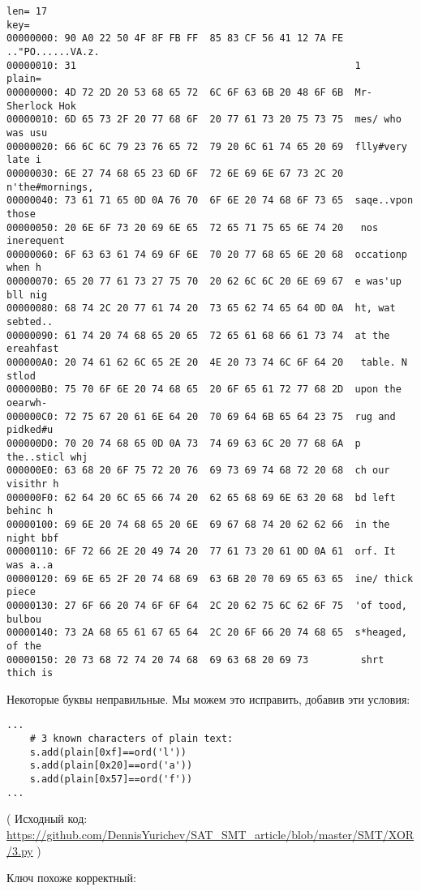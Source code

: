 \begin{lstlisting}
len= 17
key=
00000000: 90 A0 22 50 4F 8F FB FF  85 83 CF 56 41 12 7A FE  .."PO......VA.z.
00000010: 31                                                1
plain=
00000000: 4D 72 2D 20 53 68 65 72  6C 6F 63 6B 20 48 6F 6B  Mr- Sherlock Hok
00000010: 6D 65 73 2F 20 77 68 6F  20 77 61 73 20 75 73 75  mes/ who was usu
00000020: 66 6C 6C 79 23 76 65 72  79 20 6C 61 74 65 20 69  flly#very late i
00000030: 6E 27 74 68 65 23 6D 6F  72 6E 69 6E 67 73 2C 20  n'the#mornings,
00000040: 73 61 71 65 0D 0A 76 70  6F 6E 20 74 68 6F 73 65  saqe..vpon those
00000050: 20 6E 6F 73 20 69 6E 65  72 65 71 75 65 6E 74 20   nos inerequent
00000060: 6F 63 63 61 74 69 6F 6E  70 20 77 68 65 6E 20 68  occationp when h
00000070: 65 20 77 61 73 27 75 70  20 62 6C 6C 20 6E 69 67  e was'up bll nig
00000080: 68 74 2C 20 77 61 74 20  73 65 62 74 65 64 0D 0A  ht, wat sebted..
00000090: 61 74 20 74 68 65 20 65  72 65 61 68 66 61 73 74  at the ereahfast
000000A0: 20 74 61 62 6C 65 2E 20  4E 20 73 74 6C 6F 64 20   table. N stlod
000000B0: 75 70 6F 6E 20 74 68 65  20 6F 65 61 72 77 68 2D  upon the oearwh-
000000C0: 72 75 67 20 61 6E 64 20  70 69 64 6B 65 64 23 75  rug and pidked#u
000000D0: 70 20 74 68 65 0D 0A 73  74 69 63 6C 20 77 68 6A  p the..sticl whj
000000E0: 63 68 20 6F 75 72 20 76  69 73 69 74 68 72 20 68  ch our visithr h
000000F0: 62 64 20 6C 65 66 74 20  62 65 68 69 6E 63 20 68  bd left behinc h
00000100: 69 6E 20 74 68 65 20 6E  69 67 68 74 20 62 62 66  in the night bbf
00000110: 6F 72 66 2E 20 49 74 20  77 61 73 20 61 0D 0A 61  orf. It was a..a
00000120: 69 6E 65 2F 20 74 68 69  63 6B 20 70 69 65 63 65  ine/ thick piece
00000130: 27 6F 66 20 74 6F 6F 64  2C 20 62 75 6C 62 6F 75  'of tood, bulbou
00000140: 73 2A 68 65 61 67 65 64  2C 20 6F 66 20 74 68 65  s*heaged, of the
00000150: 20 73 68 72 74 20 74 68  69 63 68 20 69 73         shrt thich is
\end{lstlisting}

Некоторые буквы неправильные.
Мы можем это исправить, добавив эти условия:

\begin{lstlisting}
...
    # 3 known characters of plain text:
    s.add(plain[0xf]==ord('l'))
    s.add(plain[0x20]==ord('a'))
    s.add(plain[0x57]==ord('f'))
...
\end{lstlisting}

( Исходный код: \url{https://github.com/DennisYurichev/SAT_SMT_article/blob/master/SMT/XOR/3.py} )

Ключ похоже корректный:

